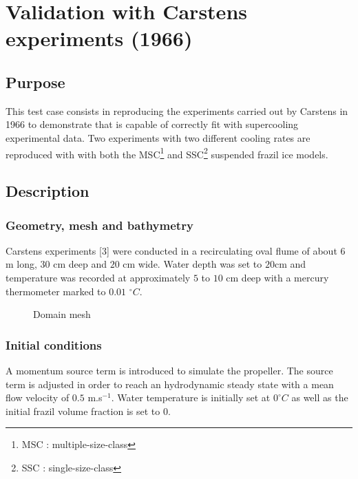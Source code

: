\renewcommand{\labelitemi}{$\triangleright$}

\chapter{Validation with Carstens experiments (1966)}

\section{Purpose}

This test case consists in reproducing the experiments carried out by Carstens in 1966 \citep{carstens_1966} 
to demonstrate that \khione is capable of correctly fit with supercooling experimental data.
Two experiments with two different cooling rates are reproduced with \khione 
with both the MSC\footnote{MSC : multiple-size-class} and SSC\footnote{SSC : single-size-class} suspended frazil ice models.

\section{Description}

\subsection{Geometry, mesh and bathymetry}

Carstens experiments [3] were conducted in a recirculating oval flume of about $6$ m long, $30$ cm deep and $20$ cm
wide. Water depth was set to $20$cm and temperature was recorded at approximately $5$ to $10$ cm deep with
a mercury thermometer marked to $0.01$ $^\circ C$.

\begin{figure}[H]
    \begin{center}
    \end{center}
    \caption{Domain mesh}
    \label{fig:growth_mesh}
\end{figure}

\subsection{Initial conditions}

A momentum source term is introduced to simulate the propeller. The source
term is adjusted in order to reach an hydrodynamic steady state with a mean flow velocity of $0.5$ m.s$^{-1}$.
Water temperature is initially set at $0^\circ C$ as well as the initial frazil volume fraction is set to $0$.

